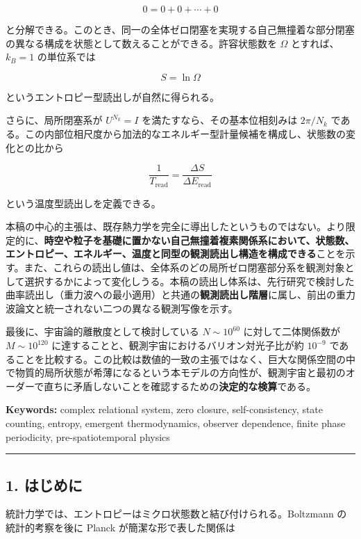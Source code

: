 \documentclass[
  a4paper,
]{ltjsarticle}
\begin{document}
\[
0=0+0+\cdots+0
\]

と分解できる。このとき、同一の全体ゼロ閉塞を実現する自己無撞着な部分閉塞の異なる構成を状態として数えることができる。許容状態数を
\(\Omega\) とすれば、\(k_B=1\) の単位系では

\[
S=\ln\Omega
\]

というエントロピー型読出しが自然に得られる。

さらに、局所閉塞系が \(U^{N_k}=I\) を満たすなら、その基本位相刻みは
\(2\pi/N_k\)
である。この内部位相尺度から加法的なエネルギー型計量候補を構成し、状態数の変化との比から

\[
\frac{1}{T_{\mathrm{read}}}
=
\frac{\Delta S}{\Delta E_{\mathrm{read}}}
\]

という温度型読出しを定義できる。

本稿の中心的主張は、既存熱力学を完全に導出したというものではない。より限定的に、\textbf{時空や粒子を基礎に置かない自己無撞着複素関係系において、状態数、エントロピー、エネルギー、温度と同型の観測読出し構造を構成できる}ことを示す。また、これらの読出し値は、全体系のどの局所ゼロ閉塞部分系を観測対象として選択するかによって変化しうる。本稿の読出し体系は、先行研究で検討した曲率読出し（重力波への最小適用）と共通の\textbf{観測読出し階層}に属し、前出の重力波論文と統一されない二つの異なる観測写像を示す。

最後に、宇宙論的離散度として検討している \(N\sim10^{60}\)
に対して二体関係数が \(M\sim10^{120}\)
に達することと、観測宇宙におけるバリオン対光子比が約 \(10^{-9}\)
であることを比較する。この比較は数値的一致の主張ではなく、巨大な関係空間の中で物質的局所状態が希薄になるという本モデルの方向性が、観測宇宙と最初のオーダーで直ちに矛盾しないことを確認するための\textbf{決定的な検算}である。

\textbf{Keywords:} complex relational system, zero closure,
self-consistency, state counting, entropy, emergent thermodynamics,
observer dependence, finite phase periodicity, pre-spatiotemporal
physics

\begin{center}\rule{0.5\linewidth}{0.5pt}\end{center}

\subsection{1. はじめに}\label{ux306fux3058ux3081ux306b}

統計力学では、エントロピーはミクロ状態数と結び付けられる。Boltzmann
の統計的考察を後に Planck が簡潔な形で表した関係は
\end{document}
